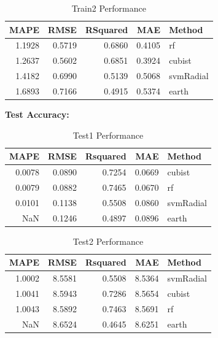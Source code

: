 \documentclass[]{report}
\begin{document}
\begin{table}[H]

\caption{\label{tab:unnamed-chunk-7}Train2 Performance}
\centering
\fontsize{8}{10}\selectfont
\begin{tabular}{rrrrl}
\toprule
MAPE & RMSE & RSquared & MAE & Method\\
\midrule
\rowcolor{gray!6}  1.1928 & 0.5719 & 0.6860 & 0.4105 & rf\\
1.2637 & 0.5602 & 0.6851 & 0.3924 & cubist\\
\rowcolor{gray!6}  1.4182 & 0.6990 & 0.5139 & 0.5068 & svmRadial\\
1.6893 & 0.7166 & 0.4915 & 0.5374 & earth\\
\bottomrule
\end{tabular}
\end{table}

\textbf{Test Accuracy:}

\begin{table}[H]

\caption{\label{tab:unnamed-chunk-8}Test1 Performance}
\centering
\fontsize{8}{10}\selectfont
\begin{tabular}{rrrrl}
\toprule
MAPE & RMSE & Rsquared & MAE & Method\\
\midrule
\rowcolor{gray!6}  0.0078 & 0.0890 & 0.7254 & 0.0669 & cubist\\
0.0079 & 0.0882 & 0.7465 & 0.0670 & rf\\
\rowcolor{gray!6}  0.0101 & 0.1138 & 0.5508 & 0.0860 & svmRadial\\
NaN & 0.1246 & 0.4897 & 0.0896 & earth\\
\bottomrule
\end{tabular}
\end{table}

\begin{table}[H]

\caption{\label{tab:unnamed-chunk-8}Test2 Performance}
\centering
\fontsize{8}{10}\selectfont
\begin{tabular}{rrrrl}
\toprule
MAPE & RMSE & Rsquared & MAE & Method\\
\midrule
\rowcolor{gray!6}  1.0002 & 8.5581 & 0.5508 & 8.5364 & svmRadial\\
1.0041 & 8.5943 & 0.7286 & 8.5654 & cubist\\
\rowcolor{gray!6}  1.0043 & 8.5892 & 0.7463 & 8.5691 & rf\\
NaN & 8.6524 & 0.4645 & 8.6251 & earth\\
\bottomrule
\end{tabular}
\end{table}
\end{document}
